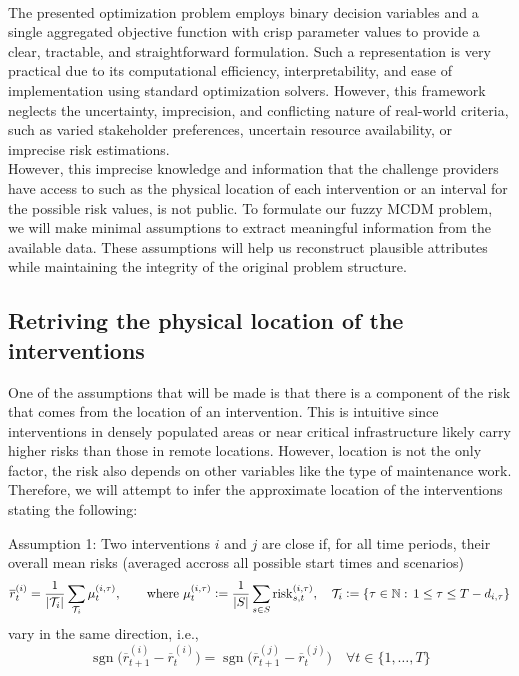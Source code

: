 \\
The presented optimization problem employs binary decision variables and a single aggregated objective function with crisp parameter values to provide a clear, tractable, and straightforward formulation. Such a representation is very practical due to its computational efficiency, interpretability, and ease of implementation using standard optimization solvers. However, this framework neglects the uncertainty, imprecision, and conflicting nature of  real-world criteria, such as varied stakeholder preferences, uncertain resource availability, or imprecise risk estimations. \\

However, this imprecise knowledge and information that the challenge providers have access to such as the physical location of each intervention or an interval for the possible risk values, is not public. To formulate our fuzzy MCDM problem, we will make minimal assumptions to extract meaningful information from the available data. These assumptions will help us reconstruct plausible attributes while maintaining the integrity of the original problem structure.\\


\subsection{Retriving the physical location of the interventions}
One of the assumptions that will be made is that there is a component of the risk that comes from the location of an intervention. This is intuitive since interventions in densely populated areas or near critical infrastructure likely carry higher risks than those in remote locations. However, location is not the only factor, the risk also depends on other variables like the type of maintenance work. \\

Therefore, we will attempt to infer the approximate location of the interventions stating the following:
\begin{notation}{Assumption 1:}
    Two interventions \(i\) and \(j\) are close if, for all time periods, their overall mean risks (averaged accross all possible start times and scenarios)
    \[
    \overline{r}_t^{(i)} = \frac{1}{\left|\mathcal{T}_i\right|}\sum_{\mathcal{T}_i}\mu_t^{(i,\tau)}, 
    \qquad \text{where }\mu_t^{(i,\tau)} \mathrel{\mathop:}= \frac{1}{|S|}\sum_{s\in S} \mathrm{risk}_{s,t}^{(i,\tau)}, \quad
    \mathcal{T}_i\mathrel{\mathop:}= \{\tau\in \mathbb{N}:\,1\leq \tau \leq T-d_{i,\tau}\}
    \]
    vary in the same direction, i.e.,
    \[
    \operatorname{sgn}\Big(\overline{r}_{t+1}^{(i)}-\overline{r}_t^{(i)}\Big)=\operatorname{sgn}\Big(\overline{r}_{t+1}^{(j)}-\overline{r}_t^{(j)}\Big)\quad\forall t\in\{1,\dots , T\}
    \]
    \end{notation}


